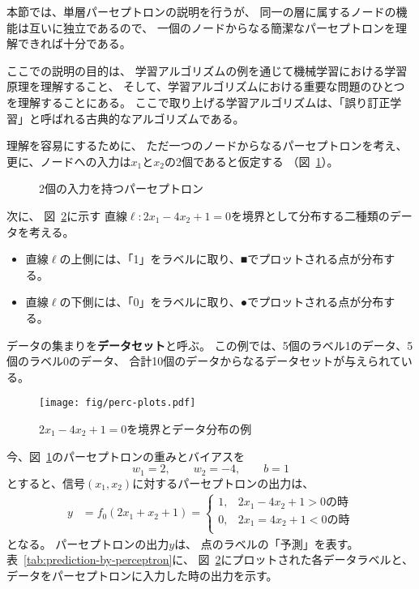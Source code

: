 本節では、単層パーセプトロンの説明を行うが、
同一の層に属するノードの機能は互いに独立であるので、
一個のノードからなる簡潔なパーセプトロンを理解できれば十分である。

ここでの説明の目的は、
学習アルゴリズムの例を通じて機械学習における学習原理を理解すること、
そして、学習アルゴリズムにおける重要な問題のひとつを理解することにある。
ここで取り上げる学習アルゴリズムは、「誤り訂正学習」と呼ばれる古典的なアルゴリズムである。

理解を容易にするために、
ただ一つのノードからなるパーセプトロンを考え、
更に、ノードへの入力は$x_1$と$x_2$の2個であると仮定する
（図~\ref{fig:perceptron-with-two-inputs}）。

\begin{figure}
  \centering
  
  \caption{2個の入力を持つパーセプトロン}
  \label{fig:perceptron-with-two-inputs}
\end{figure}

次に、
図~\ref{fig:data-sample-1}に示す
直線$\ell: 2x_1 - 4x_2 + 1 = 0$を境界として分布する二種類のデータを考える。
\begin{itemize}
\item 直線$\ell$の上側には、「1」をラベルに取り、■でプロットされる点が分布する。
\item 直線$\ell$の下側には、「0」をラベルに取り、●でプロットされる点が分布する。
\end{itemize}
データの集まりを\textbf{データセット}と呼ぶ。
この例では、5個のラベル1のデータ、5個のラベル0のデータ、
合計10個のデータからなるデータセットが与えられている。

\begin{figure}
  \centering
  \texttt{[image: fig/perc-plots.pdf]}
  \caption{$2x_1 - 4 x_2 + 1 = 0$を境界とデータ分布の例}
  \label{fig:data-sample-1}
\end{figure}

今、図~\ref{fig:perceptron-with-two-inputs}のパーセプトロンの重みとバイアスを
\[
  w_1 = 2,\qquad w_2 = -4,\qquad b = 1
\]
とすると、信号$(x_1, x_2)$に対するパーセプトロンの出力は、
\begin{align*}
  y
  &
    = f_0(2x_1 + x_2 + 1)
    =
    \begin{cases}
      1, & \text{$2x_1 - 4x_2 + 1 > 0$の時}\\
      0, & \text{$2x_1 = 4x_2 + 1 < 0$の時}\\
    \end{cases}
\end{align*}
となる。
パーセプトロンの出力$y$は、
点のラベルの「予測」を表す。
表~\ref{tab:prediction-by-perceptron}に、
図~\ref{fig:data-sample-1}にプロットされた各データラベルと、
データをパーセプトロンに入力した時の出力を示す。


